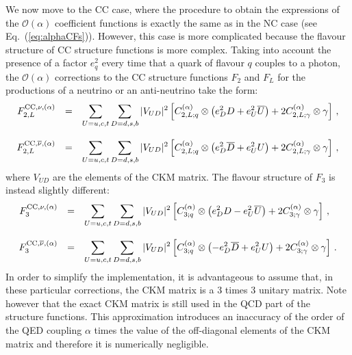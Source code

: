 We now move to the CC case, where the procedure to obtain the
expressions of the $\mathcal{O}(\alpha)$ coefficient functions is
exactly the same as in the NC case (see
Eq.~(\ref{eq:alphaCFs})). However, this case is more complicated
because the flavour structure of CC structure functions is more
complex.
%
Taking into account the presence of a factor $e_q^2$ every time that a
quark of flavour $q$ couples to a photon, the $\mathcal{O}(\alpha)$
corrections to the CC structure functions $F_2$ and $F_L$ for the
productions of a neutrino or an anti-neutrino take the form:
\begin{equation}\label{compactNu}
\begin{array}{rcl}
F_{2,L}^{{\rm CC},\nu,(\alpha)} &=& \displaystyle
                              \sum_{U=u,c,t}\sum_{D=d,s,b}|V_{UD}|^2\left[C_{2,L;q}^{(\alpha)}\otimes\left(e_D^2D +e_U^2\overline{U}\right) +2 C_{2,L;\gamma}^{(\alpha)}\otimes\gamma\right]\,,\\
\\
F_{2,L}^{{\rm CC},\overline{\nu},(\alpha)} &=& \displaystyle
\sum_{U=u,c,t}\sum_{D=d,s,b}|V_{UD}|^2\left[C_{2,L;q}^{(\alpha)}\otimes\left(e_D^2\overline{D}
    +e_U^2U\right) +2 C_{2,L;\gamma}^{(\alpha)}\otimes\gamma\right]\,,
\end{array}
\end{equation}
where $V_{UD}$ are the elements of the CKM matrix.
%
The flavour structure of $F_3$ is instead slightly different:
\begin{equation}\label{compactNuF3}
\begin{array}{rcl}
F_3^{{\rm CC},\nu,(\alpha)} &=& \displaystyle
                              \sum_{U=u,c,t}\sum_{D=d,s,b}|V_{UD}|^2\left[C_{3;q}^{(\alpha)}\otimes\left(e_D^2D -e_U^2\overline{U}\right) +2 C_{3;\gamma}^{(\alpha)}\otimes\gamma\right]\,,\\
\\
F_3^{{\rm CC},\overline{\nu},(\alpha)} &=& \displaystyle
\sum_{U=u,c,t}\sum_{D=d,s,b}|V_{UD}|^2\left[C_{3;q}^{(\alpha)}\otimes\left(-e_D^2\overline{D}
    +e_U^2U\right) +2 C_{3;\gamma}^{(\alpha)}\otimes\gamma\right]\,.
\end{array}
\end{equation}
In order to simplify the implementation, it is advantageous to assume
that, in these particular corrections, the CKM matrix is a 3 times 3
unitary matrix. Note however that the exact CKM matrix is still used
in the QCD part of the structure functions.
%
This approximation introduces an inaccuracy of the order of the QED
coupling $\alpha$ times the value of the off-diagonal elements of the
CKM matrix and therefore it is numerically negligible.

